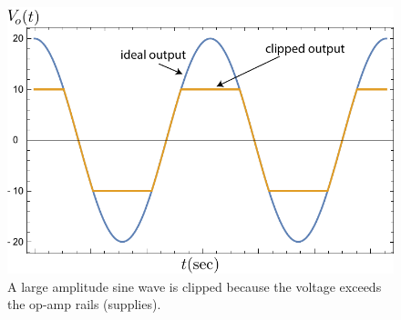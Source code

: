 \begin{figure}[tb]
\begin{center}
\includegraphics[width=.75\columnwidth]{sin_clip}
\end{center}
\caption{A large amplitude sine wave is clipped because the voltage exceeds the op-amp rails (supplies).}
\label{fig:sin_clip}
\end{figure}
